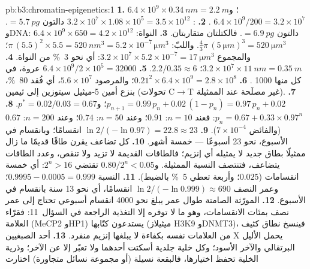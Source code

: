 \begin{solution}{pb:b3:chromatin-epigenetics:1}
\textbf{1.} $6.4\times 10^{9}\times \qty{0.34}{nm} = \qty{2.2}{m}$؛
و$6.4\times 10^{9}/200 = 3.2\times 10^{7}$ .
\textbf{2.} : $3.2\times 10^{7}\times 1.08\times 10^{5} =
3.5\times 10^{12}$ دالتون $= \qty{5.7}{pg}$. وDNA: $6.4\times 10^{9}\times
650 = 4.2\times 10^{12}$ دالتون $= \qty{6.9}{pg}$. فالكتلتان متقاربتان.
\textbf{3.} النواة: $\tfrac{4}{3}\pi\,(\qty{5}{\micro m})^{3} =
\qty{520}{\micro m^3}$. واللبّ: $\pi\,(5.5)^{2}\times 5.5 =
\qty{520}{nm^3} = 5.2\times 10^{-7}\,\unit{\micro m^3}$؛ والمجموع
$3.2\times 10^{7}\times 5.2\times 10^{-7} = \qty{17}{\micro m^3}$:
أي نحو \qty{3}{\%} من النواة.
\textbf{4.} $3.2\times 10^{7}\times \qty{11}{nm} = \qty{0.35}{m}$؛
 $2.2/0.35 \approx 6$.
\textbf{5.} $6.4\times 10^{9}/2\times 10^{5} = \num{32000}$ عروة، في كل
منها \num{1000} .
\textbf{6.} $0.21^{2}\times 6.4\times 10^{9} = 2.8\times 10^{8}$؛
والمرصود $5.6\times 10^{7}$، أي فُقد \qty{80}{\%}، بنزع أمين
5-ميثيل سيتوزين إلى ثيمين (تحولات C$\to$T غير مصلَحة عند
 الممثيلة).
\textbf{7.} $p_{n+1} = 0.99\,p_{n} + 0.02\,(1 - p_{n}) = 0.97\,p_{n} +
0.02$؛ و$p^{*} = 0.02/0.03 = 0.67$.
\textbf{8.} $p_{n} = 0.67 + 0.33\times 0.97^{n}$: فعند $n = 10$: $0.91$؛
وعند $n = 50$: $0.74$؛ وعند $n = 200$: $0.67$ (والفائض $7\times 10^{-4}$).
\textbf{9.} $\ln 2/(-\ln 0.97) = 22.8 \approx 23$ انقسامًا؛ وبانقسام
في الأسبوع، نحو \num{23} أسبوعًا --- خمسة أشهر.
\textbf{10.} كل تضاعف يقرن طاقًا قديمًا ما زال ممثيلًا بطاق جديد لا
يمثيله أي إنزيم؛ فالطاقات القديمة لا تزيد ولا تنقص، وعدد الطاقات
يتضاعف، فتنتصف النسبة الممثيلة. و$0.80/2^{n} < 0.05$ تقتضي
$2^{n} > 16$: أي خمسة انقسامات ($0.025$؛ وأربعة تعطي \qty{5}{\%}
بالضبط).
\textbf{11.} النسبة $0.9995 - 0.0005 = 0.999$؛ وعمر النصف $\ln
2/(-\ln 0.999) \approx 690$ انقسامًا، أي نحو \num{13} سنة بانقسام
في الأسبوع.
\textbf{12.} المورّثة الصامتة طوال عمر يبلغ نحو \num{4000} انقسام
أسبوعي تحتاج إلى عمر نصف بمئات الانقسامات، وهو ما لا توفره إلا
التغذية الراجعة في السؤال~11: فقرّاء العلامة (MeCP2 وHP1)
يستدعون كتّابها (ميثيلاز H3K9 وDNMT3)، فينسخ نطاق كثيف من العلامات
نفسه بكفاءة لا يبلغها إنزيم منفرد.
\textbf{13.} أحد الصبغيين X يحمل الأليل البرتقالي والآخر الأسود؛
وكل خلية جلدية أسكتت أحدهما ولا تعبّر إلا عن الآخر؛ وذرية الخلية
تحفظ اختيارها، فالبقعة نسيلة (أو مجموعة نسائل متجاورة) اختارت

\end{solution}
